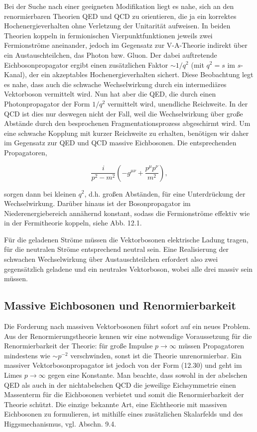 \documentclass[10pt, letterpaper]{article}
\begin{document}
Bei der Suche nach einer geeigneten Modifikation liegt es nahe, sich an den renormierbaren Theorien QED und QCD zu orientieren, die ja ein korrektes Hochenergieverhalten ohne Verletzung der Unitarität aufweisen. In beiden Theorien koppeln in fermionischen Vierpunktfunktionen jeweils zwei Fermionströme aneinander, jedoch im Gegensatz zur V-A-Theorie indirekt über ein Austauschteilchen, das Photon bzw. Gluon. Der dabei auftretende Eichbosonpropagator ergibt einen zusätzlichen Faktor $\sim 1 / q^{2}$ (mit $q^{2}=s$ im $s$-Kanal), der ein akzeptables Hochenergieverhalten sichert. Diese Beobachtung legt es nahe, dass auch die schwache Wechselwirkung durch ein intermediäres Vektorboson vermittelt wird. Nun hat aber die QED, die durch einen Photonpropagator der Form $1 / q^{2}$ vermittelt wird, unendliche Reichweite. In der QCD ist dies nur deswegen nicht der Fall, weil die Wechselwirkung über große Abstände durch den besprochenen Fragmentationsprozess abgeschirmt wird. Um eine schwache Kopplung mit kurzer Reichweite zu erhalten, benötigen wir daher im Gegensatz zur QED und QCD massive Eichbosonen. Die entsprechenden Propagatoren,

$$
\frac{i}{p^{2}-m^{2}}\left(-g^{\mu \nu}+\frac{p^{\mu} p^{\nu}}{m^{2}}\right),
$$

sorgen dann bei kleinen $q^{2}$, d.h. großen Abständen, für eine Unterdrückung der Wechselwirkung. Darüber hinaus ist der Bosonpropagator im Niederenergiebereich annähernd konstant, sodass die Fermionströme effektiv wie in der Fermitheorie koppeln, siehe Abb. 12.1.

Für die geladenen Ströme müssen die Vektorbosonen elektrische Ladung tragen, für die neutralen Ströme entsprechend neutral sein. Eine Realisierung der schwachen Wechselwirkung über Austauschteilchen erfordert also zwei gegensätzlich geladene und ein neutrales Vektorboson, wobei alle drei massiv sein müssen.

\subsection*{Massive Eichbosonen und Renormierbarkeit}
Die Forderung nach massiven Vektorbosonen führt sofort auf ein neues Problem. Aus der Renormierungstheorie kennen wir eine notwendige Voraussetzung für die Renormierbarkeit der Theorie: für große Impulse $p \rightarrow \infty$ müssen Propagatoren mindestens wie $\sim p^{-2}$ verschwinden, sonst ist die Theorie unrenormierbar. Ein massiver Vektorbosonpropagator ist jedoch von der Form (12.30) und geht im Limes $p \rightarrow \infty$ gegen eine Konstante. Man beachte, dass sowohl in der abelschen QED als auch in der nichtabelschen QCD die jeweilige Eichsymmetrie einen Massenterm für die Eichbosonen verbietet und somit die Renormierbarkeit der Theorie schützt. Die einzige bekannte Art, eine Eichtheorie mit massiven Eichbosonen zu formulieren, ist mithilfe eines zusätzlichen Skalarfelds und des Higgsmechanismus, vgl. Abschn. 9.4.
\end{document}
